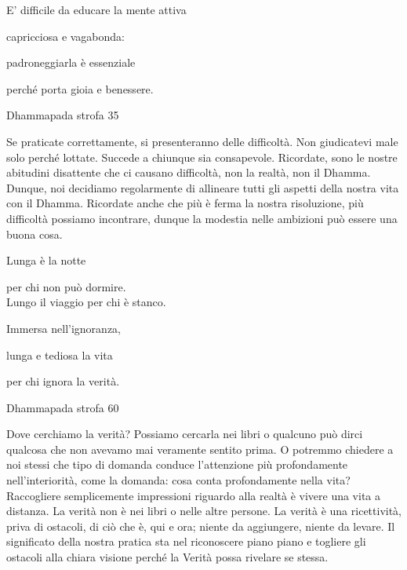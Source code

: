 \documentclass[a4paper,portrait,12pt]{article}
\begin{document}
\newpage



E' difficile da educare la mente attiva


capricciosa e vagabonda:


padroneggiarla \`{e} essenziale


perch\'{e} porta gioia e benessere. 





Dhammapada strofa 35


\newpage



Se praticate correttamente, si presenteranno delle difficolt\`{a}. Non giudicatevi male solo perch\'{e} lottate. Succede a chiunque sia consapevole. Ricordate, sono le nostre abitudini disattente che ci causano difficolt\`{a}, non la realt\`{a}, non il Dhamma. Dunque, noi decidiamo regolarmente di allineare tutti gli aspetti della nostra vita con il Dhamma. Ricordate anche che più \`{e} ferma la nostra risoluzione, più difficolt\`{a} possiamo incontrare, dunque la modestia nelle ambizioni pu\`{o} essere una buona cosa.


\newpage



Lunga \`{e} la notte


per chi non pu\`{o} dormire.\\Lungo il viaggio per chi \`{e} stanco.


Immersa nell'ignoranza,


lunga e tediosa la vita


per chi ignora la verit\`{a}. 





Dhammapada strofa 60


\newpage



Dove cerchiamo la verit\`{a}? Possiamo cercarla nei libri o qualcuno pu\`{o} dirci qualcosa che non avevamo mai veramente sentito prima. O potremmo chiedere a noi stessi che tipo di domanda conduce l'attenzione più profondamente nell'interiorit\`{a}, come la domanda: cosa conta profondamente nella vita? Raccogliere semplicemente impressioni riguardo alla realt\`{a} \`{e} vivere una vita a distanza. La verit\`{a} non \`{e} nei libri o nelle altre persone. La verit\`{a} \`{e} una ricettivit\`{a}, priva di ostacoli, di ci\`{o} che \`{e}, qui e ora; niente da aggiungere, niente da levare. Il significato della nostra pratica sta nel riconoscere piano piano e togliere gli ostacoli alla chiara visione perch\'{e} la Verit\`{a} possa rivelare se stessa.
\end{document}
